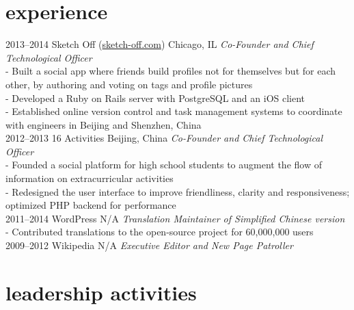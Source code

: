 \documentclass[]{friggeri-cv} %
\begin{document}

\section{experience}

\begin{entrylist}
\entry
{2013--2014}
{Sketch Off \quad\normalfont (\underline{sketch-off.com})}
{Chicago, IL}
{\emph{Co-Founder and Chief Technological Officer} \\
- Built a social app where friends build profiles not for themselves but for each other, by authoring and voting on tags and profile pictures \\
- Developed a Ruby on Rails server with PostgreSQL and an iOS client \\
- Established online version control and task management systems to coordinate with engineers in Beijing and Shenzhen, China \\}
\entry
{2012--2013}
{16 Activities}
{Beijing, China}
{\emph{Co-Founder and Chief Technological Officer} \\
-   Founded a social platform for high school students to augment the flow of information on extracurricular activities \\
-   Redesigned the user interface to improve friendliness, clarity and responsiveness; optimized PHP backend for performance \\}
\entry
{2011--2014}
{WordPress}
{N/A}
{\emph{Translation Maintainer of Simplified Chinese version} \\
-   Contributed translations to the open-source project for 60,000,000 users \\}
\entry
{2009--2012}
{Wikipedia}
{N/A}
{\emph{Executive Editor and New Page Patroller}}

\end{entrylist}


\section{leadership activities}
\end{document}
